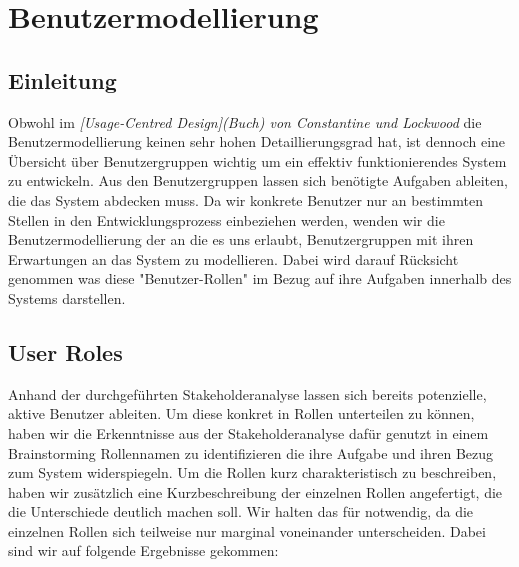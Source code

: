 \section{Benutzermodellierung}
\label{sec:Benutzermodellierung}

\subsection{Einleitung}
\label{sec:Benutzermodellierung Einleitung}

Obwohl im \textit{[Usage-Centred Design](Buch) von Constantine und Lockwood}
die Benutzermodellierung keinen sehr hohen Detaillierungsgrad hat, ist dennoch
eine Übersicht über Benutzergruppen wichtig um ein effektiv funktionierendes
System zu entwickeln. Aus den Benutzergruppen lassen sich benötigte Aufgaben
ableiten, die das System abdecken muss. Da wir konkrete Benutzer nur an
bestimmten Stellen in den Entwicklungsprozess einbeziehen werden, wenden wir
die Benutzermodellierung der \textit{\citep{[User Roles](Buchverweis)}} an die es uns erlaubt,
Benutzergruppen mit ihren Erwartungen an das System zu modellieren. Dabei wird
darauf Rücksicht genommen was diese "Benutzer-Rollen" im Bezug auf ihre
Aufgaben innerhalb des Systems darstellen.

\subsection{User Roles}
\label{sec:User Roles}

Anhand der durchgeführten Stakeholderanalyse lassen sich bereits potenzielle,
aktive Benutzer ableiten. Um diese konkret in Rollen unterteilen zu können,
haben wir die Erkenntnisse aus der Stakeholderanalyse dafür genutzt in einem
Brainstorming Rollennamen zu identifizieren die ihre Aufgabe und ihren Bezug
zum System widerspiegeln.
Um die Rollen kurz charakteristisch zu beschreiben, haben wir zusätzlich eine
Kurzbeschreibung der einzelnen Rollen angefertigt, die die Unterschiede
deutlich machen soll. Wir halten das für notwendig, da die einzelnen Rollen
sich teilweise nur marginal voneinander unterscheiden.
Dabei sind wir auf folgende Ergebnisse gekommen:


